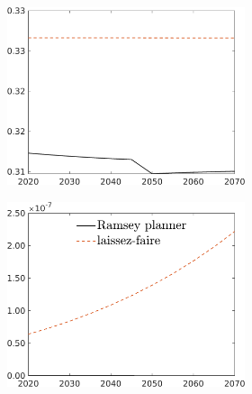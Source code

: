 \begin{figure}[h!!]
\begin{subfigure}{1\textwidth}
\begin{subfigure}[]{0.32\textwidth}
\end{subfigure}	
\begin{subfigure}[]{0.32\textwidth}
\includegraphics[width=1\textwidth]{../../codding_model/own_basedOnFried/optimalPol_010922_revision/figures/all_13Sept22_Tplus30/hl_LFCompOPT_T_NoTaus_regime4_spillover0_noskill0_sep0_xgrowth0_PV1_etaa0.79_lgd0.png}
\end{subfigure}	
	\begin{subfigure}[]{0.32\textwidth}
	\includegraphics[width=1\textwidth]{../../codding_model/own_basedOnFried/optimalPol_010922_revision/figures/all_13Sept22_Tplus30/sff_LFCompOPT_T_NoTaus_regime4_spillover0_noskill0_sep0_xgrowth0_PV1_etaa0.79_lgd1.png}

\end{subfigure}
\end{subfigure}
\end{figure}
